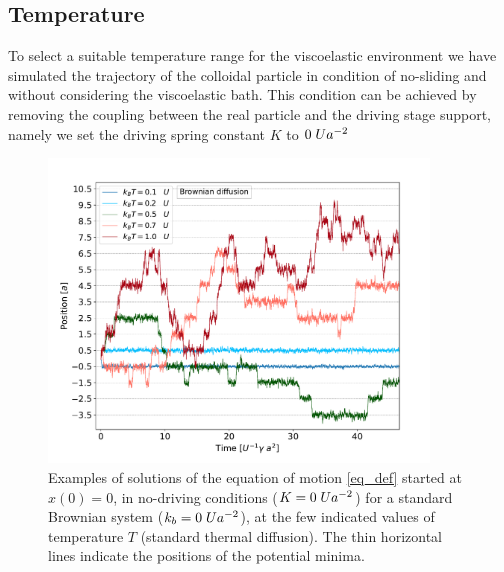 \subsection{Temperature}
To select a suitable temperature range for the viscoelastic environment we have simulated the trajectory of the colloidal particle in condition of no-sliding and without considering the viscoelastic bath. 
This condition can be achieved by removing the coupling between the real particle and the driving stage support, namely we set the driving spring constant $K$ to $0\hspace{0.1cm}Ua^{-2}$
\begin{figure}
    \centering
\includegraphics[width=0.9\textwidth]{scelta_temperatura.pdf}
\caption{Examples of solutions of the equation of motion \eqref{eq_def} started at $x(0)=0$, in no-driving conditions ($K=0\hspace{0.1cm}Ua^{-2}$) for a standard Brownian system ($k_b=0\hspace{0.1cm}Ua^{-2}$), at the few indicated values of temperature $T$ (standard thermal diffusion). The thin horizontal lines indicate the positions of the potential minima.}
\label{graph_Tchoice}
\end{figure}

